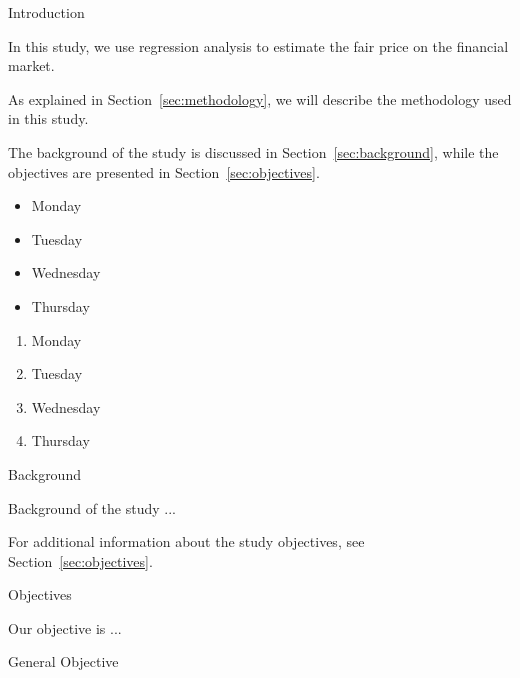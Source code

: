 \documentclass[12pt]{article}	%
\begin{document}
	\begin{section}{Introduction}	%
		\label{sec:introduction}	%

		In this study, we use regression analysis to estimate the fair
		price on the financial market.

		As explained in Section~\ref{sec:methodology}, we will describe
		the methodology used in this study.

		The background of the study is discussed in
		Section~\ref{sec:background}, while the objectives are presented
		in Section~\ref{sec:objectives}.

		\begin{itemize}	%
			\item Monday
			\item Tuesday
			\item Wednesday
			\item Thursday
		\end{itemize}	%

		\begin{enumerate}	%
			\item Monday
			\item Tuesday
			\item Wednesday
			\item Thursday
		\end{enumerate}	%

		\begin{subsection}{Background}	%
			\label{sec:background}	%

			Background of the study ...

			For additional information about the study objectives,
			see Section~\ref{sec:objectives}.
		\end{subsection}	%

		\begin{subsection}{Objectives}	%
			\label{sec:objectives}	%

			Our objective is ...

			\begin{subsubsection}{General Objective}	%
				\label{sec:general-objective}	%


\end{subsubsection}
\end{subsection}
\end{section}
\end{document}
